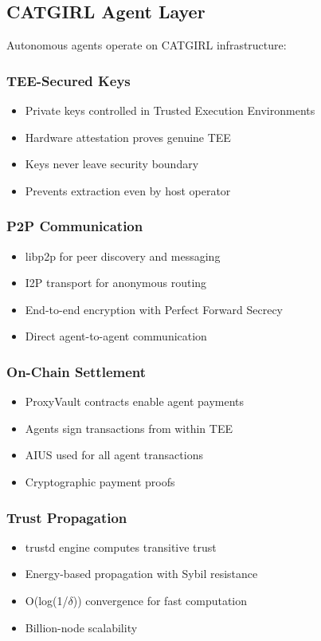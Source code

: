 \documentclass{article}
\begin{document}
\subsection{CATGIRL Agent Layer}

Autonomous agents operate on CATGIRL infrastructure:

\subsubsection{TEE-Secured Keys}
\begin{itemize}
    \item Private keys controlled in Trusted Execution Environments
    \item Hardware attestation proves genuine TEE
    \item Keys never leave security boundary
    \item Prevents extraction even by host operator
\end{itemize}

\subsubsection{P2P Communication}
\begin{itemize}
    \item libp2p for peer discovery and messaging
    \item I2P transport for anonymous routing
    \item End-to-end encryption with Perfect Forward Secrecy
    \item Direct agent-to-agent communication
\end{itemize}

\subsubsection{On-Chain Settlement}
\begin{itemize}
    \item ProxyVault contracts enable agent payments
    \item Agents sign transactions from within TEE
    \item AIUS used for all agent transactions
    \item Cryptographic payment proofs
\end{itemize}

\subsubsection{Trust Propagation}
\begin{itemize}
    \item trustd engine computes transitive trust
    \item Energy-based propagation with Sybil resistance
    \item O(log(1/$\delta$)) convergence for fast computation
    \item Billion-node scalability
\end{itemize}
\end{document}
